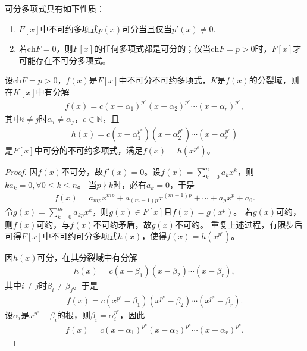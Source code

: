 \documentclass[../../main.tex]{subfiles}%
\begin{document}
\begin{remark}
可分多项式具有如下性质：
\begin{enumerate}[(1)]
\item $F[x]$中不可约多项式$p(x)$可分当且仅当$p'(x)\neq0$.
\item 若$\mathrm{ch}F=0$，则$F[x]$的任何多项式都是可分的；仅当$\mathrm{ch}F=p>0$时，$F[x]$才可能存在不可分多项式。
\end{enumerate}
\end{remark}

\begin{theorem}
设$\mathrm{ch}F=p>0$，$f(x)$是$F[x]$中不可分不可约多项式，$K$是$f(x)$的分裂域，则在$K[x]$中有分解
\begin{align*}
f(x)=c(x-\alpha_1)^{p^e}(x-\alpha_2)^{p^e}\cdots(x-\alpha_r)^{p^e},
\end{align*}
其中$i\neq j$时$\alpha_i\neq\alpha_j$，$e\in\mathbb{N}$，且
\begin{align*}
h(x)=c(x-\alpha_1^{p^e})(x-\alpha_2^{p^e})\cdots(x-\alpha_r^{p^e})
\end{align*}
是$F[x]$中可分的不可约多项式，满足$f(x)=h(x^{p^e})$。
\end{theorem}

\begin{proof}

因$f(x)$不可分，故$f'(x)=0$。设$f(x)=\sum\limits_{k=0}^n a_kx^k$，则$ka_k=0,\forall 0\leqslant k\leqslant n$。
当$p\nmid k$时，必有$a_k=0$，于是
\begin{align*}
f(x)=a_{mp}x^{mp}+a_{(m-1)p}x^{(m-1)p}+\cdots+a_px^p+a_0.
\end{align*}
令$g(x)=\sum\limits_{k=0}^m a_{kp}x^k$，则$g(x)\in F[x]$且$f(x)=g(x^p)$。
若$g(x)$可约，则$f(x)$可约，与$f(x)$不可约矛盾，故$g(x)$不可约。
重复上述过程，有限步后可得$F[x]$中不可约可分多项式$h(x)$，使得$f(x)=h(x^{p^e})$。

因$h(x)$可分，在其分裂域中有分解
\begin{align*}
h(x)=c(x-\beta_1)(x-\beta_2)\cdots(x-\beta_r),
\end{align*}
其中$i\neq j$时$\beta_i\neq\beta_j$。于是
\begin{align*}
f(x)=c(x^{p^e}-\beta_1)(x^{p^e}-\beta_2)\cdots(x^{p^e}-\beta_r).
\end{align*}
设$\alpha_i$是$x^{p^e}-\beta_i$的根，则$\beta_i=\alpha_i^{p^e}$，因此
\begin{align*}
f(x)=c(x-\alpha_1)^{p^e}(x-\alpha_2)^{p^e}\cdots(x-\alpha_r)^{p^e}.
\end{align*}

\end{proof}
\end{document}
